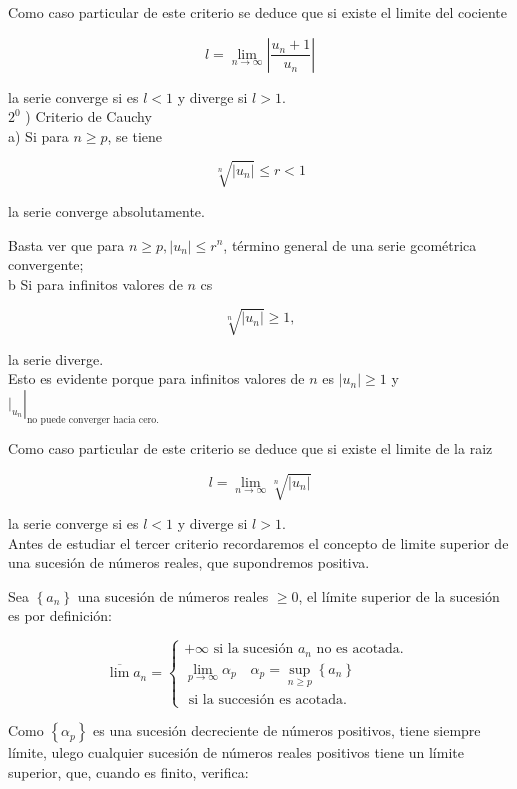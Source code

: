 \documentclass[10pt]{article}
\theoremstyle{plain}
\theoremstyle{definition}
\theoremstyle{remark}
\begin{document}
Como caso particular de este criterio se deduce que si existe el limite del cociente

$$
l=\lim _{n \rightarrow \infty}\left|\frac{u_{n}+1}{u_{n}}\right|
$$

la serie converge si es $l<1$ y diverge si $l>1$.\\
$2^{0}$ ) Criterio de Cauchy\\
a) Si para $n \geqslant p$, se tiene

$$
\sqrt[n]{\left|u_{n}\right|} \leqslant r<1
$$

la serie converge absolutamente.

Basta ver que para $n \geqslant p,\left|u_{n}\right| \leqslant r^{n}$, término general de una serie gcométrica convergente;\\
b Si para infinitos valores de $n$ cs

$$
\sqrt[n]{\left|u_{n}\right|} \geqslant 1,
$$

la serie diverge.\\
Esto es evidente porque para infinitos valores de $n$ es $\left|u_{n}\right| \geqslant 1$ y $\left.\left.\right|_{u_{n}}\right|_{\text {no puede converger hacia cero. }}$

Como caso particular de este criterio se deduce que si existe el limite de la raiz

$$
l=\lim _{n \rightarrow \infty} \sqrt[n]{\left|u_{n}\right|}
$$

la serie converge si es $l<1$ y diverge si $l>1$.\\
Antes de estudiar el tercer criterio recordaremos el concepto de limite superior de una sucesión de números reales, que supondremos positiva.

Sea $\left\{a_{n}\right\}$ una sucesión de números reales $\geqslant 0$, el límite superior de la sucesión es por definición:

$$
\overline{\lim } a_{n}=\left\{\begin{array}{l}
+\infty \text { si la sucesión } a_{n} \text { no es acotada. } \\
\lim _{p \rightarrow \infty} \alpha_{p} \quad \alpha_{p}=\sup _{n \geqslant p}\left\{a_{n}\right\} \\
\text { si la succesión es acotada. }
\end{array}\right.
$$

Como $\left\{\alpha_{p}\right\}$ es una sucesión decreciente de números positivos, tiene siempre límite, ulego cualquier sucesión de números reales positivos tiene un límite superior, que, cuando es finito, verifica:
\end{document}
